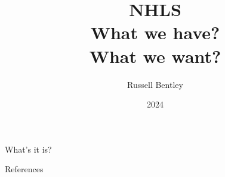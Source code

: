 \documentclass{beamer}
\title{NHLS\\What we have?\\What we want?}
\author{Russell Bentley}
\institute{Stony Brook}
\date{2024}
\begin{document}
\frame{\titlepage}



\begin{frame}{What's it is?}

\end{frame}

\begin{frame}[allowframebreaks]{References}
    \tiny
    \printbibliography
\end{frame}
\end{document}
